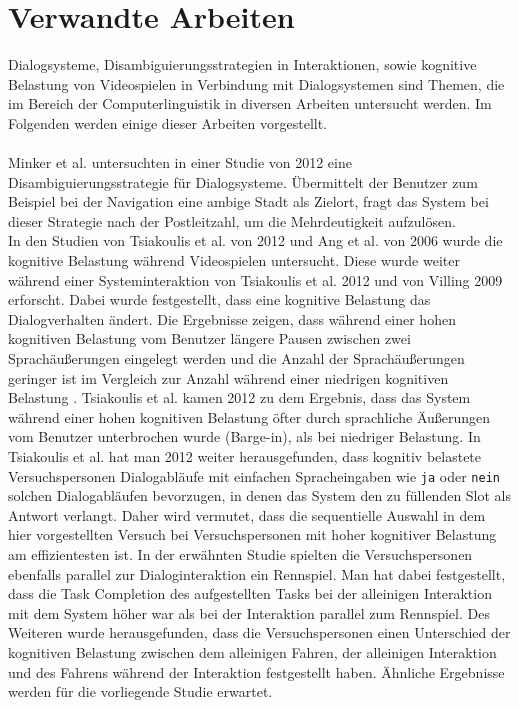 \documentclass[12pt,a4paper]{scrartcl}
\begin{document}
\newpage
\section{Verwandte Arbeiten}

Dialogsysteme, Disambiguierungsstrategien in Interaktionen, sowie kognitive Belastung von Videospielen in Verbindung mit Dialogsystemen sind Themen, die im Bereich der Computerlinguistik in diversen Arbeiten untersucht werden. Im Folgenden werden einige dieser Arbeiten vorgestellt. \\
\\
Minker et al. untersuchten in einer Studie von 2012 eine Disambiguierungsstrategie für Dialogsysteme. Übermittelt der Benutzer zum Beispiel bei der Navigation eine ambige Stadt als Zielort, fragt das System bei dieser Strategie nach der Postleitzahl, um die Mehrdeutigkeit aufzulösen. \\
In den Studien von Tsiakoulis et al. von 2012 und Ang et al. von 2006 wurde die kognitive Belastung während Videospielen untersucht. Diese wurde weiter während einer Systeminteraktion von Tsiakoulis et al. 2012 und von Villing 2009 erforscht. Dabei wurde festgestellt, dass eine kognitive Belastung das Dialogverhalten ändert. Die Ergebnisse zeigen, dass während einer hohen kognitiven Belastung vom Benutzer längere Pausen zwischen zwei Sprachäußerungen eingelegt werden und die Anzahl der Sprachäußerungen geringer ist im Vergleich zur Anzahl während einer niedrigen kognitiven Belastung \cite{DbCL}.
Tsiakoulis et al. kamen 2012 zu dem Ergebnis, dass das System während einer hohen kognitiven Belastung öfter durch sprachliche Äußerungen vom Benutzer unterbrochen wurde (Barge-in), als bei niedriger Belastung.
In Tsiakoulis et al.  hat man 2012 weiter herausgefunden, dass kognitiv belastete Versuchspersonen Dialogabläufe mit einfachen Spracheingaben wie \texttt{ja} oder \texttt{nein} solchen Dialogabläufen bevorzugen, in denen das System den zu füllenden Slot als Antwort verlangt. Daher wird vermutet, dass die sequentielle Auswahl in dem hier vorgestellten Versuch bei Versuchspersonen mit hoher kognitiver Belastung am effizientesten ist.  In der erwähnten Studie spielten die Versuchspersonen ebenfalls parallel zur Dialoginteraktion ein Rennspiel. Man hat dabei festgestellt, dass die Task Completion des aufgestellten Tasks bei der alleinigen Interaktion mit dem System höher war als bei der Interaktion parallel zum Rennspiel. Des Weiteren wurde herausgefunden, dass die Versuchspersonen einen Unterschied der kognitiven Belastung zwischen dem alleinigen Fahren, der alleinigen Interaktion und des Fahrens während der Interaktion festgestellt haben. Ähnliche Ergebnisse werden für die vorliegende Studie erwartet. \\
\end{document}
